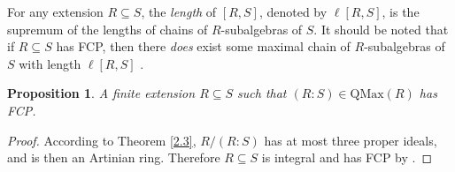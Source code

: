 \documentclass[12pt,leqno]{amsart}
\newtheorem{proposition}[theorem]{Proposition}
\theoremstyle{definition}
\begin{document}
For any extension $R\subseteq S$, the {\it length} of $[R,S]$, denoted by $\ell[R,S]$, is the supremum of the lengths of chains of $R$-subalgebras of $S$. It should be noted that if $R\subseteq S$ has FCP, then there {\it does} exist some maximal chain of $R$-subalgebras of $S$ with length $\ell[R,S]$ \cite[Theorem 4.11]{DPP3}.

\begin{proposition}\label{3.20} A finite extension $R\subseteq S$ such that  $(R:S)\in\mathrm{QMax}(R)$  has FCP.
\end{proposition}
\begin{proof} According to Theorem \ref{2.3}, $R/(R:S)$ has at most three proper ideals, and is then an Artinian ring. Therefore $R\subseteq S$ is integral and has FCP by \cite[Theorem 4.2]{DPP2}.
\end{proof}
\end{document}
